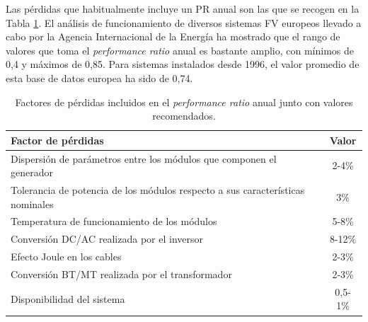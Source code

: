 Las pérdidas que habitualmente incluye un PR anual son las que se
recogen en la Tabla \ref{tab:PR}. El análisis de funcionamiento de diversos sistemas FV europeos llevado
a cabo por la Agencia Internacional de la Energía
\cite{Clavadetscher.Nordmann2007} ha mostrado que el rango de valores
que toma el \emph{performance ratio} anual es bastante amplio, con mínimos
de 0,4 y máximos de 0,85. Para sistemas instalados desde 1996, el
valor promedio de esta base de datos europea ha sido de 0,74.
%
\begin{table}
  \caption{Factores de pérdidas incluidos en el \emph{performance
      ratio} anual junto
    con valores recomendados.\label{tab:PR}}

\begin{tabular}{>{\centering}p{8cm}c}
  \toprule 
  Factor de pérdidas & Valor\tabularnewline
  \midrule
  \midrule 
  Dispersión de parámetros entre los módulos que componen el generador  & 2-4\%\tabularnewline
  \midrule 
  Tolerancia de potencia de los módulos respecto a sus características
  nominales  & 3\%\tabularnewline
  \midrule 
  Temperatura de funcionamiento de los módulos  & 5-8\%\tabularnewline
  \midrule 
  Conversión DC/AC realizada por el inversor & 8-12\%\tabularnewline
  \midrule 
  Efecto Joule en los cables  & 2-3\%\tabularnewline
  \midrule 
  Conversión BT/MT realizada por el transformador & 2-3\%\tabularnewline
  \midrule 
  Disponibilidad del sistema  & 0,5-1\%\tabularnewline
  \bottomrule
\end{tabular}
\end{table}





